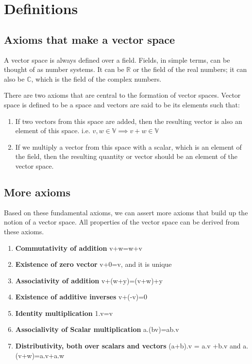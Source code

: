 \section{Definitions} \label{sec:sed-ultrices}

\subsection{Axioms that make a vector space}

A vector space is always defined over a field. Fields, in simple terms, can be thought of as number systems. It can be $\mathbb{R}$ or the field of the real numbers; it can also be $\mathbb{C}$, which is the field of the complex numbers. 

There are two axioms that are central to the formation of vector spaces. Vector space is defined to be a space and vectors are said to be its elements such that:

\begin{enumerate}
\item{If two vectors from this space are added, then the resulting vector is also an element of this space. i.e. $v,w \in \mathbb{V} \implies v+w \in \mathbb{V}$}
\item{If we multiply a vector from this space with a scalar, which is an element of the field, then the resulting quantity or vector should be an element of the vector space.}
\end{enumerate}

\subsection{More axioms}

Based on these fundamental axioms, we can assert more axioms that build up the notion of a vector space. All properties of the vector space can be derived from these axioms.


\begin{enumerate}
    \item \textbf{Commutativity of addition} v+w=w+v
    \item \textbf{Existence of zero vector} 
    v+0=v, and it is unique
    \item \textbf{Associativity of addition}
    v+(w+y)=(v+w)+y
    \item \textbf{Existence of additive inverses}
    v+(-v)=0
    \item \textbf{Identity multiplication}
    1.v=v
    \item \textbf{Associalivity of Scalar multiplication} a.(bv)=ab.v
    \item \textbf{Distributivity, both over scalars and vectors} (a+b).v = a.v +b.v 
    and a.(v+w)=a.v+a.w
\end{enumerate}

